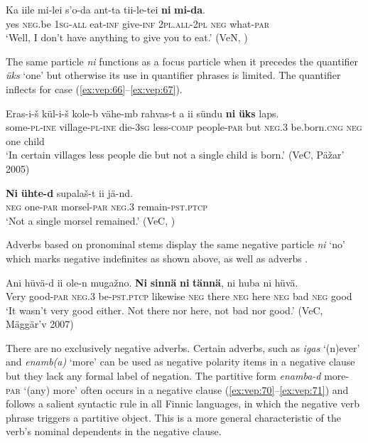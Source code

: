 \documentclass[output=paper,colorlinks=true, citecolor=brown]{langscibook}
\begin{document}
\ea
    \label{ex:vep:65}
    \gll Ka iile mi-lei s’o-da ant-ta tii-le-tei \textbf{ni} \textbf{mi-da}. \\
         yes \textsc{neg}.be \textsc{1sg}-\textsc{all} eat\textsc{-inf} give\textsc{-inf} \textsc{2pl.all}-\textsc{2pl} \textsc{neg}  what-\textsc{par}\\
    \glt ‘Well, I don’t have anything to give you to eat.’ (VeN, \citealt[154]{MSFOu70})
\z

The same particle \textit{ni} functions as a focus particle when it precedes the quantifier \textit{üks} ‘one’ but otherwise its use in quantifier phrases is limited. The quantifier inflects for case (\ref{ex:vep:66}–\ref{ex:vep:67}).

\ea
    \label{ex:vep:66}
    \gll Eras-i-š  kül-i-š kole-b vähe-mb rahvas-t a ii  sündu \textbf{ni} \textbf{üks} laps. \\
          some{}-\textsc{pl}{}-\textsc{ine} village{}-\textsc{pl}{}-\textsc{ine} die-\textsc{3sg} less\textsc{{}-comp} people-\textsc{par} but \textsc{neg.3} be.born.\textsc{cng} \textsc{neg} one child\\
    \glt ‘In certain villages less people die but not a single child is born.’ (VeC, Päžar’ 2005)
\z 

\ea
    \label{ex:vep:67}
    \gll \textbf{Ni} \textbf{ühte{}-d} supalaš{}-t ii jä{}-nd.\\
         \textsc{neg} one-\textsc{par} morsel-\textsc{par} \textsc{neg.3} remain-\textsc{pst.ptcp}\\
    \glt ‘Not a single morsel remained.’ (VeC, \citealt[97]{MSFOu70})
\z 

Adverbs based on pronominal stems display the same negative particle \textit{ni} ‘no’ which marks negative indefinites as shown above, as well as adverbs .

\ea
    \label{ex:vep:68}
    \gll Ani hüvä{}-d ii ole{}-n mugažno. \textbf{Ni} \textbf{sinnä} \textbf{ni} \textbf{tännä}, ni huba ni hüvä.\\
         Very good-\textsc{par} \textsc{neg.3} be-\textsc{pst.ptcp} likewise \textsc{neg} there \textsc{neg} here \textsc{neg} bad \textsc{neg} good\\
    \glt ‘It wasn’t very good either. Not there nor here, not bad nor good.’ (VeC, Mäggär’v 2007)
\z

There are no exclusively negative adverbs. Certain adverbs, such as \textit{igas} ‘(n)ever’  and \textit{enamb(a)} ‘more’ can be used as negative polarity items in a negative clause but they lack any formal label of negation. 
The partitive form \textit{enamba-d} more-\textsc{par} ‘(any) more’ often occurs in a negative clause (\ref{ex:vep:70}–\ref{ex:vep:71}) and follows a salient syntactic rule in all Finnic languages, in which the negative verb phrase triggers a partitive object. 
This is a more general characteristic of the verb’s nominal dependents in the negative clause.
\end{document}
